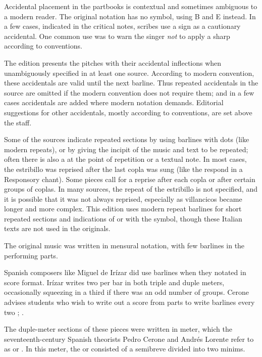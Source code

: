 Accidental placement in the partbooks is contextual and sometimes ambiguous to 
a modern reader.
The original notation has no \na{} symbol, using B\sh{} and E\sh{} instead.
In a few cases, indicated in the critical notes, scribes use a \sh{} sign as a 
cautionary accidental.
One common use was to warn the singer \emph{not} to apply a sharp according 
to  conventions.%
  \autocites{Harran:Cautionary1}{Harran:Cautionary2}

The edition presents the pitches with their accidental inflections when 
unambiguously specified in at least one source.
According to modern convention, these accidentals are valid until the next 
barline.
Thus repeated accidentals in the source are omitted if the modern convention 
does not require them; and in a few cases accidentals are added where modern 
notation demands.
Editorial suggestions for other accidentals, mostly according to  conventions, are set above the staff.

Some of the sources indicate repeated sections by using barlines with dots (like
modern repeats), or by giving the incipit of the music and text to be repeated;
often there is also a  at the point of repetition or a
textual note.
In most cases, the estribillo was reprised after the last copla was sung (like
the respond in a Responsory chant).
Some pieces call for a reprise after each copla or after certain groups of
coplas.
In many sources, the repeat of the estribillo is not specified, and it is
possible that it was not always reprised, especially as villancicos became
longer and more complex.%
    \Autocite{Torrente:Estribillo}
This edition uses modern repeat barlines for short repeated sections and
indications of  or  with the
\musSegno{} symbol, though these Italian texts are not used in the originals.

The original music was written in mensural notation, with few barlines in the 
performing parts.%
\begin{Footnote}
    Spanish composers like Miguel de Irízar did use barlines when they notated in 
    score format.
    Irízar writes two  per bar in both triple and duple meters,
    occasionally squeezing in a third  if there was an odd number
    of groups.
    Cerone advises students who wish to write out a score from parts to write 
    barlines every two ; \textcite[745]{Cerone:Melopeo}.
\end{Footnote}
The duple-meter sections of these pieces were written in \meterC{} meter, which
the seventeenth-century Spanish theorists Pedro Cerone and Andrés Lorente refer
to as  or .%
  \Autocites[537]{Cerone:Melopeo}[156, 210]{Lorente:Porque}
In this meter, the  or  consisted of a semibreve 
divided into two minims.%
  \Autocites{GonzalezValle:MusicaTexto}{GonzalezValle:CompasCabezon}

